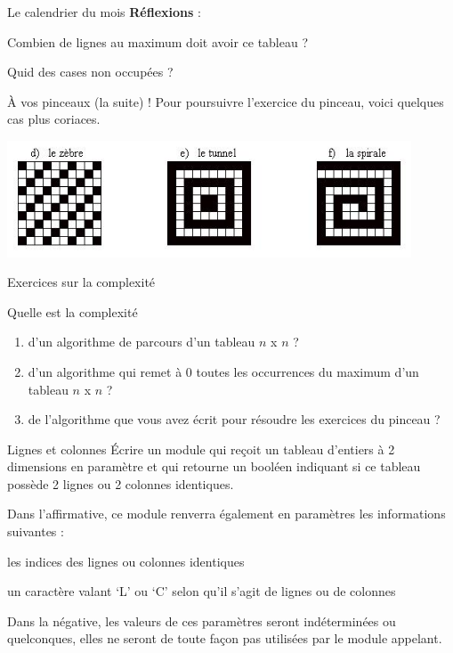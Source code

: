 \begin{Exercice}{Le calendrier du mois}
	\textbf{Réflexions} :

	\begin{liste}
	\item Combien de lignes au maximum doit avoir ce tableau ?
	\item Quid des cases non occupées ?
	\end{liste}
\end{Exercice}

\begin{Exercice}{À vos pinceaux (la suite) !}
	Pour poursuivre l'exercice du pinceau, 
	voici quelques cas plus coriaces.
	
	\begin{center}
	\includegraphics[width=0.9\textwidth]{image/tab2d-ex-zts}
	\end{center}
\end{Exercice}

\begin{Exercice}{Exercices sur la complexité}

	Quelle est la complexité 
	\begin{enumerate}[label=\alph*)]
	\item 
		d’un algorithme de parcours	d'un tableau $n$ x $n$ ?
	\item
		d'un algorithme qui remet à 0 toutes les
		occurrences du maximum d'un tableau $n$ x $n$ ?
	\item 
		de l'algorithme que vous avez écrit pour résoudre les
		exercices du pinceau ?
	\end{enumerate}
\end{Exercice}

\begin{Exercice}{Lignes et colonnes}
	Écrire un module qui reçoit un tableau d’entiers à 2 dimensions en paramètre 
	et qui retourne un booléen indiquant si ce tableau 
	possède 2 lignes ou 2 colonnes identiques.
	
	Dans l’affirmative, 
	ce module renverra également en paramètres les informations suivantes :
	
	\begin{liste}
	\item les indices des lignes ou colonnes identiques
	\item un caractère valant ‘L’ ou ‘C’ selon qu’il s’agit de lignes ou de
	colonnes
	\end{liste}
	
	Dans la négative, les valeurs de ces paramètres seront indéterminées ou
	quelconques, elles ne seront de toute façon pas utilisées par le module
	appelant.
\end{Exercice}
